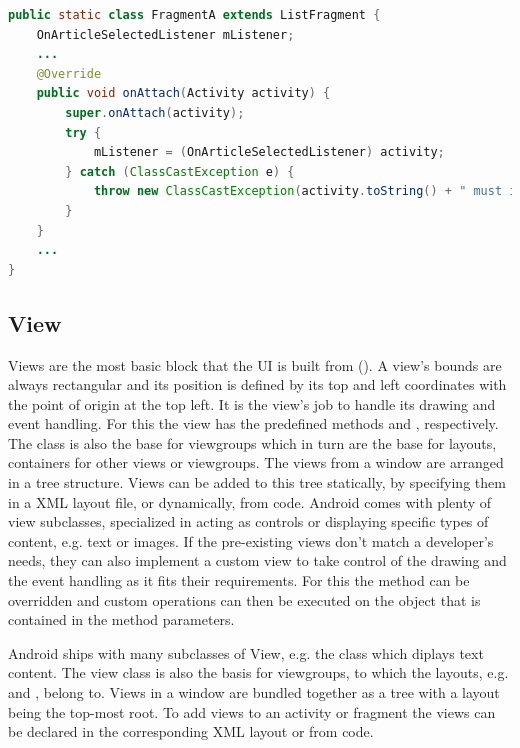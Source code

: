 \vspace*{0.5cm}
\begin{lstlisting}[language=JAVA, caption=Example code for enforcing the implementation of a callback interface, label=lst:callback_interface]
public static class FragmentA extends ListFragment {
    OnArticleSelectedListener mListener;
    ...
    @Override
    public void onAttach(Activity activity) {
        super.onAttach(activity);
        try {
            mListener = (OnArticleSelectedListener) activity;
        } catch (ClassCastException e) {
            throw new ClassCastException(activity.toString() + " must implement OnArticleSelectedListener");
        }
    }
    ...
}
\end{lstlisting}

\subsection{View}
Views are the most basic block that the \gls{UI} is built from (\cite{android_view}). A view's bounds are always rectangular and its position is defined by its top and left coordinates with the point of origin at the top left. It is the view's job to handle its drawing and event handling. For this the view has the predefined methods  and , respectively. The  class is also the base for viewgroups which in turn are the base for layouts, containers for other views or viewgroups.
The views from a window are arranged in a tree structure. Views can be added to this tree statically, by specifying them in a \gls{XML} layout file, or dynamically, from code. Android comes with plenty of view subclasses, specialized in acting as controls or displaying specific types of content, e.g. text or images. If the pre-existing views don't match a developer's needs, they can also implement a custom view to take control of the drawing and the event handling as it fits their requirements. For this the  method can be overridden and custom operations can then be executed on the  object that is contained in the method parameters.

Android ships with many subclasses of View, e.g. the  class which diplays text content. The view class is also the basis for viewgroups, to which the layouts, e.g.  and , belong to. Views in a window are bundled together as a tree with a layout being the top-most root. To add views to an activity or fragment the views can be declared in the corresponding \gls{XML} layout or from code. 

